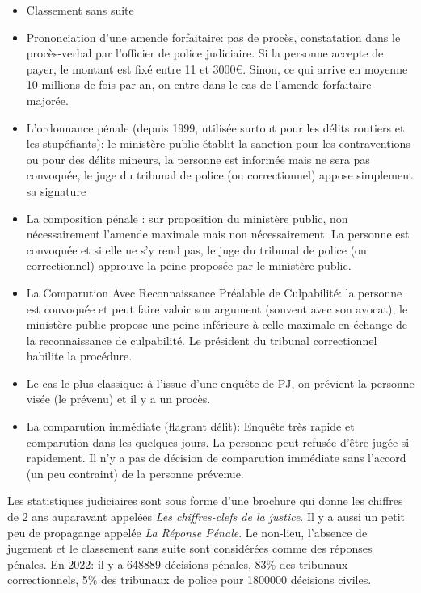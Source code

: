 \documentclass[math]{cours}
\begin{document}
	\begin{itemize}
		\item Classement sans suite
		\item Prononciation d'une amende forfaitaire: pas de procès, constatation dans le procès-verbal par l'officier de police judiciaire.
			Si la personne accepte de payer, le montant est fixé entre 11 et 3000€.
			Sinon, ce qui arrive en moyenne 10 millions de fois par an, on entre dans le cas de l'amende forfaitaire majorée.
		\item L'ordonnance pénale (depuis 1999, utilisée surtout pour les délits routiers et les stupéfiants):
			le ministère public établit la sanction pour les contraventions ou pour des délits mineurs,
			la personne est informée mais ne sera pas convoquée, le juge du tribunal de police (ou correctionnel) appose simplement sa signature
		\item La composition pénale :
			sur proposition du ministère public, non nécessairement l'amende maximale mais non nécessairement.
			La personne est convoquée et si elle ne s'y rend pas, le juge du tribunal de police (ou correctionnel) approuve la peine proposée par le ministère public.
		\item La Comparution Avec Reconnaissance Préalable de Culpabilité:
			la personne est convoquée et peut faire valoir son argument (souvent avec son avocat),
			le ministère public propose une peine inférieure à celle maximale en échange de la reconnaissance de culpabilité.
			Le président du tribunal correctionnel habilite la procédure.

		\item Le cas le plus classique:
			à l'issue d'une enquête de PJ, on prévient la personne visée (le prévenu) et il y a un procès.
		\item La comparution immédiate (flagrant délit):
			Enquête très rapide et comparution dans les quelques jours.
			La personne peut refusée d'être jugée si rapidement.
			Il n'y a pas de décision de comparution immédiate sans l'accord (un peu contraint) de la personne prévenue.
	\end{itemize}
	Les statistiques judiciaires sont sous forme d'une brochure qui donne les chiffres de 2 ans auparavant appelées \textit{Les chiffres-clefs de la justice}.
	Il y a aussi un petit peu de propagange appelée \textit{La Réponse Pénale}.
	Le non-lieu, l'absence de jugement et le classement sans suite sont considérées comme des réponses pénales.
	En 2022: il y a 648889 décisions pénales, 83\% des tribunaux correctionnels, 5\% des tribunaux de police pour 1800000 décisions civiles.\\
\end{document}
